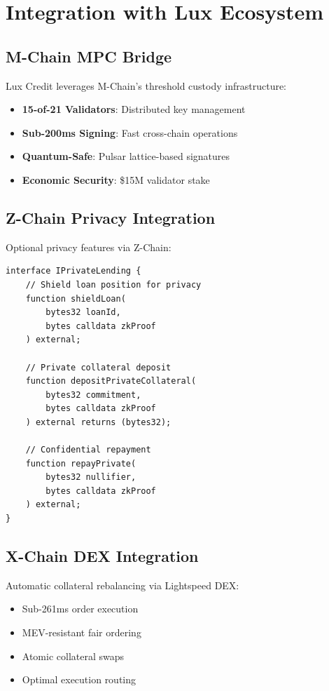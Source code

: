 \section{Integration with Lux Ecosystem}


\subsection{M-Chain MPC Bridge}

Lux Credit leverages M-Chain's threshold custody infrastructure:

\begin{itemize}
\item \textbf{15-of-21 Validators}: Distributed key management
\item \textbf{Sub-200ms Signing}: Fast cross-chain operations
\item \textbf{Quantum-Safe}: Pulsar lattice-based signatures
\item \textbf{Economic Security}: \$15M validator stake
\end{itemize}

\subsection{Z-Chain Privacy Integration}

Optional privacy features via Z-Chain:

\begin{lstlisting}[language=Solidity, basicstyle=\small\ttfamily]
interface IPrivateLending {
    // Shield loan position for privacy
    function shieldLoan(
        bytes32 loanId,
        bytes calldata zkProof
    ) external;
    
    // Private collateral deposit
    function depositPrivateCollateral(
        bytes32 commitment,
        bytes calldata zkProof
    ) external returns (bytes32);
    
    // Confidential repayment
    function repayPrivate(
        bytes32 nullifier,
        bytes calldata zkProof
    ) external;
}
\end{lstlisting}

\subsection{X-Chain DEX Integration}

Automatic collateral rebalancing via Lightspeed DEX:

\begin{itemize}
\item Sub-261ms order execution
\item MEV-resistant fair ordering
\item Atomic collateral swaps
\item Optimal execution routing
\end{itemize}


